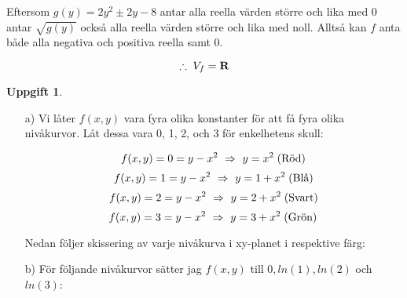 \documentclass{article}
\newtheorem{thr}{Uppgift}
\begin{document}
Eftersom $g(y)=2y^2\pm2y-8$ antar alla reella värden större och lika med 0 antar $\sqrt{g(y)}$ också alla reella värden större och lika med noll. Alltså kan $f$ anta både alla negativa och positiva reella samt 0. 

$$
\therefore\; V_{f}=\mathbf{R}
$$

\newpage

\begin{thr}
\end{thr}

\begin{enumerate}
    \item[a)] Vi låter $f(x, y)$ vara fyra olika konstanter för att få fyra olika nivåkurvor. Låt dessa vara 0, 1, 2, och 3 för enkelhetens skull:

        $$
        f(x, y)=0=y-x^2 \ \Rightarrow \  y=x^2 \; \text{(Röd)}
        $$
        $$
        f(x, y)=1=y-x^2 \ \Rightarrow \  y=1+x^2\; \text{(Blå)}
        $$
        $$
        f(x, y)=2=y-x^2 \ \Rightarrow \  y=2+x^2\; \text{(Svart)}
        $$
        $$
        f(x, y)=3=y-x^2 \ \Rightarrow \  y=3+x^2\; \text{(Grön)}
        $$

        \vskip 0.2cm

        Nedan följer skissering av varje nivåkurva i xy-planet i respektive färg: 

        \vskip 0.5cm

        \begin{figure}[h]
            \center
        \end{figure}

    \item[b)] För följande nivåkurvor sätter jag $f(x, y)$ till $0, ln(1), ln(2)$ och $ln(3)$:


\end{enumerate}
\end{document}
